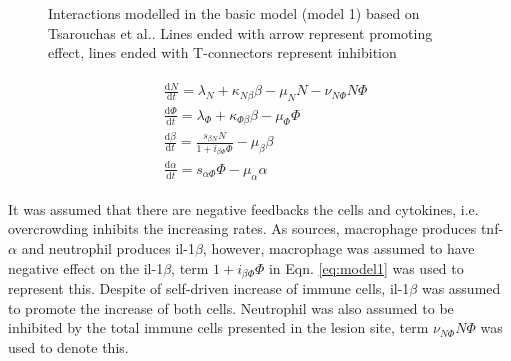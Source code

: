 \begin{figure}
    \begin{center}
    \end{center}

    \caption[Interactions modelled in the basic model]%
    {Interactions modelled in the basic model (model 1) based on Tsarouchas et al.\cite{ref:Tsarouchas}. Lines ended with arrow represent promoting effect, lines ended with T-connectors represent inhibition}
    \label{fig:m1}

\end{figure}

\begin{align}
    \label{eq:model1}
    \begin{split}
        &\frac{\mathrm{d} N}{\mathrm{d} t}=\lambda_N+\kappa_{N\beta}\beta-\mu_NN-\nu_{N\Phi}N\Phi\\
        &\frac{\mathrm{d} \Phi}{\mathrm{d} t}=\lambda_\Phi+\kappa_{\Phi\beta}\beta-\mu_\Phi\Phi\\
        &\frac{\mathrm{d} \beta}{\mathrm{d} t}=\frac{s_{\beta N}N}{1+i_{\beta\Phi}\Phi}-\mu_\beta\beta\\
        &\frac{\mathrm{d} \alpha}{\mathrm{d} t}=s_{\alpha\Phi}\Phi-\mu_\alpha\alpha
    \end{split}
\end{align}

It was assumed that there are negative feedbacks the cells and cytokines, i.e. overcrowding inhibits the increasing rates. As sources, macrophage produces tnf-$\alpha$ and neutrophil produces il-1$\beta$, however, macrophage was assumed to have negative effect on the il-1$\beta$, term $1+i_{\beta\Phi}\Phi$ in Eqn. \ref{eq:model1} was used to represent this. Despite of self-driven increase of immune cells, il-1$\beta$ was assumed to promote the increase of both cells. Neutrophil was also assumed to be inhibited by the total immune cells presented in the lesion site, term $\nu_{N\Phi}N\Phi$ was used to denote this.

